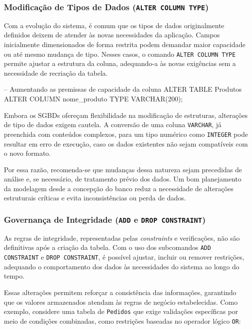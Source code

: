 \subsubsection{Modificação de Tipos de Dados (\texttt{ALTER COLUMN TYPE})}
Com a evolução do sistema, é comum que os tipos de dados originalmente definidos deixem de atender às novas necessidades da aplicação. Campos inicialmente dimensionados de forma restrita podem demandar maior capacidade ou até mesmo mudança de tipo. Nesses casos, o comando \texttt{ALTER COLUMN TYPE} permite ajustar a estrutura da coluna, adequando-a às novas exigências sem a necessidade de recriação da tabela.

\begin{sqlcode}
    -- Aumentando as premissas de capacidade da coluna
    ALTER TABLE Produtos
    ALTER COLUMN nome_produto TYPE VARCHAR(200);
\end{sqlcode}

\begin{tcolorbox}[colback=blue!5,colframe=blue!40!black,title=Nota importante: Alterações de Tipo de Dados]
Embora os SGBDs ofereçam flexibilidade na modificação de estruturas, alterações de tipo de dados exigem cautela. A conversão de uma coluna \texttt{VARCHAR}, já preenchida com conteúdos complexos, para um tipo numérico como \texttt{INTEGER} pode resultar em erro de execução, caso os dados existentes não sejam compatíveis com o novo formato.

Por essa razão, recomenda-se que mudanças dessa natureza sejam precedidas de análise e, se necessário, de tratamento prévio dos dados. Um bom planejamento da modelagem desde a concepção do banco reduz a necessidade de alterações estruturais críticas e evita inconsistências ou perda de dados.
\end{tcolorbox}

\subsubsection{Governança de Integridade (\texttt{ADD} e \texttt{DROP CONSTRAINT})}

As regras de integridade, representadas pelas \textit{constraints} e verificações, não são definitivas após a criação da tabela. Com o uso dos subcomandos \texttt{ADD CONSTRAINT} e \texttt{DROP CONSTRAINT}, é possível ajustar, incluir ou remover restrições, adequando o comportamento dos dados às necessidades do sistema ao longo do tempo.

Essas alterações permitem reforçar a consistência das informações, garantindo que os valores armazenados atendam às regras de negócio estabelecidas. Como exemplo, considere uma tabela de \texttt{Pedidos} que exige validações específicas por meio de condições combinadas, como restrições baseadas no operador lógico \texttt{OR}:

